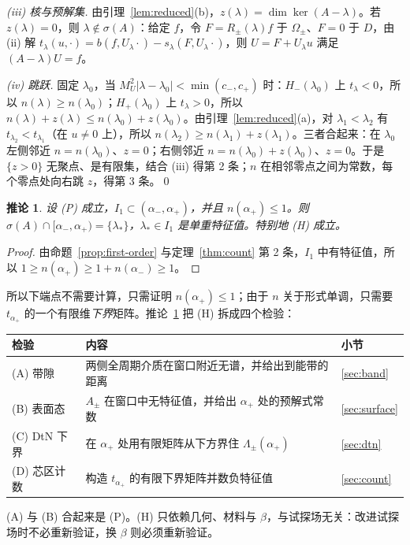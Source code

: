 \documentclass[11pt,a4paper,fontset=fandol]{ctexart}
\theoremstyle{plain}
\newtheorem{corollary}[theorem]{推论}
\theoremstyle{definition}
\theoremstyle{remark}
\begin{document}
\emph{(iii) 核与预解集.} 由引理~\ref{lem:reduced}(b)，$z(\lambda)=\dim\ker(A-\lambda)$。若 $z(\lambda)=0$，则 $\lambda\notin\sigma(A)$：给定 $f$，令 $F=R_\pm(\lambda)f$ 于 $\Omega_\pm$、$F=0$ 于 $D$，由 (ii) 解 $t_\lambda(u,\cdot)=b(f,U_\lambda\cdot)-s_\lambda(F,U_\lambda\cdot)$，则 $U=F+U_\lambda u$ 满足 $(A-\lambda)U=f$。

\emph{(iv) 跳跃.} 固定 $\lambda_0$，当 $M_U^2|\lambda-\lambda_0|<\min(c_-,c_+)$ 时：$H_-(\lambda_0)$ 上 $t_\lambda<0$，所以 $n(\lambda)\ge n(\lambda_0)$；$H_+(\lambda_0)$ 上 $t_\lambda>0$，所以 $n(\lambda)+z(\lambda)\le n(\lambda_0)+z(\lambda_0)$。由引理~\ref{lem:reduced}(a)，对 $\lambda_1<\lambda_2$ 有 $t_{\lambda_2}<t_{\lambda_1}$（在 $u\ne0$ 上），所以 $n(\lambda_2)\ge n(\lambda_1)+z(\lambda_1)$。三者合起来：在 $\lambda_0$ 左侧邻近 $n=n(\lambda_0)$、$z=0$；右侧邻近 $n=n(\lambda_0)+z(\lambda_0)$、$z=0$。于是 $\{z>0\}$ 无聚点、是有限集，结合 (iii) 得第 2 条；$n$ 在相邻零点之间为常数，每个零点处向右跳 $z$，得第 3 条。\qed

\begin{corollary}
\label{cor:H}
设 (P) 成立，$I_1\subset(\alpha_-,\alpha_+)$，并且 $n(\alpha_+)\le1$。则 $\sigma(A)\cap[\alpha_-,\alpha_+)=\{\lambda_*\}$，$\lambda_*\in I_1$ 是单重特征值。特别地 (H) 成立。
\end{corollary}

\begin{proof}
由命题~\ref{prop:first-order} 与定理~\ref{thm:count} 第 2 条，$I_1$ 中有特征值，所以 $1\ge n(\alpha_+)\ge1+n(\alpha_-)\ge1$。
\end{proof}

所以下端点不需要计算，只需证明 $n(\alpha_+)\le1$；由于 $n$ 关于形式单调，只需要 $t_{\alpha_+}$ 的一个有限维\emph{下界}矩阵。推论~\ref{cor:H} 把 (H) 拆成四个检验：
\begin{center}
\small
\begin{tabular}{>{\raggedright\arraybackslash}p{2.6cm}>{\raggedright\arraybackslash}p{8.2cm}l}
\toprule
检验 & 内容 & 小节 \\
\midrule
(A) 带隙 & 两侧全周期介质在窗口附近无谱，并给出到能带的距离 & \ref{sec:band} \\
(B) 表面态 & $A_\pm$ 在窗口中无特征值，并给出 $\alpha_+$ 处的预解式常数 & \ref{sec:surface} \\
(C) DtN 下界 & 在 $\alpha_+$ 处用有限矩阵从下方界住 $\Lambda_\pm(\alpha_+)$ & \ref{sec:dtn} \\
(D) 芯区计数 & 构造 $t_{\alpha_+}$ 的有限下界矩阵并数负特征值 & \ref{sec:count} \\
\bottomrule
\end{tabular}
\end{center}
(A) 与 (B) 合起来是 (P)。(H) 只依赖几何、材料与 $\beta$，与试探场无关：改进试探场时不必重新验证，换 $\beta$ 则必须重新验证。
\end{document}
